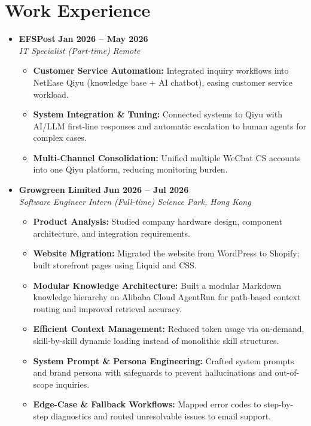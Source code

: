 \documentclass[a4paper,10pt]{article}
\begin{document}
\section{Work Experience}
\begin{itemize}[leftmargin=*, label={}, itemsep=1pt]
    \item \textbf{EFSPost} \hfill \textbf{Jan 2026 -- May 2026} \\
    \textit{IT Specialist (Part-time)} \hfill \textit{Remote}
    \begin{itemize}[leftmargin=1.2em, label={--}, itemsep=0pt, topsep=1pt]
        \item \textbf{Customer Service Automation:} Integrated inquiry workflows into NetEase Qiyu (knowledge base + AI chatbot), easing customer service workload.
        \item \textbf{System Integration \& Tuning:} Connected systems to Qiyu with AI/LLM first-line responses and automatic escalation to human agents for complex cases.
        \item \textbf{Multi-Channel Consolidation:} Unified multiple WeChat CS accounts into one Qiyu platform, reducing monitoring burden.
    \end{itemize}

    \item \textbf{Growgreen Limited} \hfill \textbf{Jun 2026 -- Jul 2026} \\
    \textit{Software Engineer Intern (Full-time)} \hfill \textit{Science Park, Hong Kong}
    \begin{itemize}[leftmargin=1.2em, label={--}, itemsep=0pt, topsep=1pt]
        \item \textbf{Product Analysis:} Studied company hardware design, component architecture, and integration requirements.
        \item \textbf{Website Migration:} Migrated the website from WordPress to Shopify; built storefront pages using Liquid and CSS.
        \item \textbf{Modular Knowledge Architecture:} Built a modular Markdown knowledge hierarchy on Alibaba Cloud AgentRun for path-based context routing and improved retrieval accuracy.
        \item \textbf{Efficient Context Management:} Reduced token usage via on-demand, skill-by-skill dynamic loading instead of monolithic skill structures.
        \item \textbf{System Prompt \& Persona Engineering:} Crafted system prompts and brand persona with safeguards to prevent hallucinations and out-of-scope inquiries.
        \item \textbf{Edge-Case \& Fallback Workflows:} Mapped error codes to step-by-step diagnostics and routed unresolvable issues to email support.
    \end{itemize}


\end{itemize}
\end{document}
